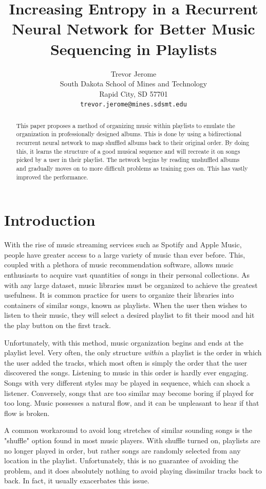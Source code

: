 \documentclass{article}
\title{Increasing Entropy in a Recurrent Neural Network for Better Music Sequencing in Playlists}
\author{
  Trevor Jerome\\
  South Dakota School of Mines and Technology\\
  Rapid City, SD 57701 \\
  \texttt{trevor.jerome@mines.sdsmt.edu} \\
}
\begin{document}

\maketitle

\begin{abstract}
This paper proposes a method of organizing music within playlists to emulate the organization in professionally designed albums. This is done by using a bidirectional recurrent neural network to map shuffled albums back to their original order. By doing this, it learns the structure of a good musical sequence and will recreate it on songs picked by a user in their playlist. The network begins by reading unshuffled albums and gradually moves on to more difficult problems as training goes on. This has vastly improved the performance.
\end{abstract}

\section{Introduction}
With the rise of music streaming services such as Spotify and Apple Music, people have greater access to a large variety of music than ever before. This, coupled with a plethora of music recommendation software, allows music enthusiasts to acquire vast quantities of songs in their personal collections. As with any large dataset, music libraries must be organized to achieve the greatest usefulness. It is common practice for users to organize their libraries into containers of similar songs, known as playlists. When the user then wishes to listen to their music, they will select a desired playlist to fit their mood and hit the play button on the first track.

Unfortunately, with this method, music organization begins and ends at the playlist level. Very often, the only structure \emph{within} a playlist is the order in which the user added the tracks, which most often is simply the order that the user discovered the songs. Listening to music in this order is hardly ever engaging. Songs with very different styles may be played in sequence, which can shock a listener. Conversely, songs that are too similar may become boring if played for too long. Music possesses a natural flow, and it can be unpleasant to hear if that flow is broken.

A common workaround to avoid long stretches of similar sounding songs is the "shuffle" option found in most music players. With shuffle turned on, playlists are no longer played in order, but rather songs are randomly selected from any location in the playlist. Unfortunately, this is no guarantee of avoiding the problem, and it does absolutely nothing to avoid playing dissimilar tracks back to back. In fact, it usually exacerbates this issue.
\end{document}
